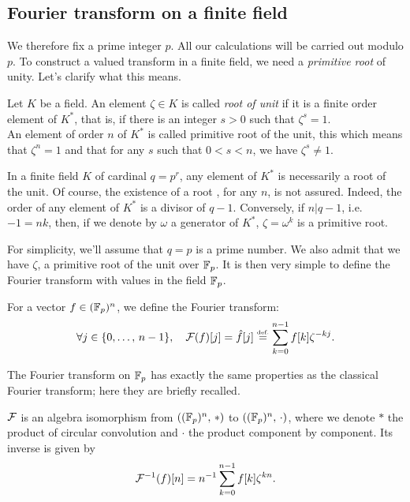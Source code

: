 \subsection{Fourier transform on a finite field}
\label{sect2-trans-fourier-finite-field}
 
 
 We therefore fix a prime integer $ p $. All our calculations will be carried out modulo $ p $. To construct a valued transform in a finite field, we need a \textit{primitive root}  of unity. Let's clarify what this means.
 
\begin{defn}
  Let $ K $ be a field. An element $ \zeta \in K $ is called \textit{root of unit} if it is a finite order element of $ K^* $, that is, if there is an integer $ s> 0 $ such that $ \zeta^s = 1 $. \\An element of order $ n $ of $ K^* $ is called primitive root  of the unit, this which means that $ \zeta^{n} = 1 $ and that for any $ s $ such that $ 0 <s <n $, we have $ \zeta^{s} \neq 1 $.
\end{defn}
In a finite field $ K $ of cardinal $ q = p^r $, any element of $ K^* $ is necessarily a root  of the unit. Of course, the existence of a root , for any $ n $, is not assured. Indeed, the order of any element of $ K^* $ is a divisor of $ q-1 $. Conversely, if $ n | q-1 $, i.e. $ -1 = nk $, then, if we denote by $ \omega $ a generator of $ K^* $, $ \zeta = \omega^{k} $ is a primitive  root.
 
 
For simplicity, we'll assume that $ q = p $ is a prime number. We also admit that we have $ \zeta $, a  primitive root of the unit over $ \mathbb{F}_p $. It is then very simple to define the Fourier transform with values in the field $ \mathbb{F}_p $.
 
\begin{defn}
For a vector $ f \in (\mathbb{F}_p)^n $, we define the Fourier transform:
\begin{equation}
\label{eq-defn-transforme-fp}
\forall j \in \{0, \ldots, \, n-1\}, \quad \mathcal{F}(f) [j] = \hat{f}[j] \stackrel{\mbox{\upshape\tiny def.}}{=} \sum_{k = 0}^{n-1}{f [k] \zeta^{- kj}}.
\end{equation}
\end{defn}
The Fourier transform on $ \mathbb{F}_p $ has exactly the same properties as the classical Fourier transform; here they are briefly recalled.
 
\begin{prop}[Properties]
\label{prop-prtes-tfd-finite-field}
$ \mathcal{F} $ is an algebra isomorphism from $ ((\mathbb{F}_p)^n, \, *) $ to $ ((\mathbb{F}_p)^n, \, \cdot) $, where we denote $ * $ the product of circular convolution and $ \cdot $ the product component by component. Its inverse is given by
\begin{equation}
\label{eq-defn-tfd-finite-field}
\mathcal{F}^{-1} (f) [n] = n^{-1} \sum_{k = 0}^{n-1}{f [k] \zeta^{kn}}.
\end{equation}
\end{prop}
 
